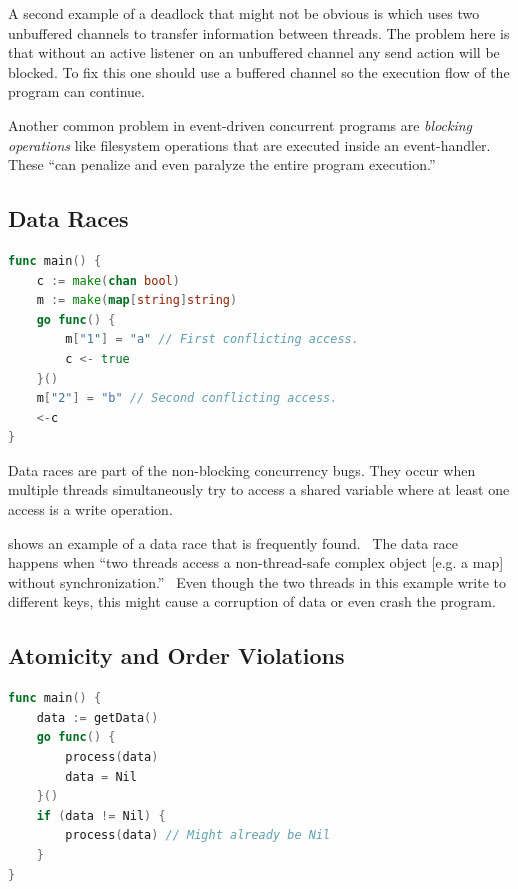\documentclass[conference]{IEEEtran}
\begin{document}
A second example of a deadlock that might not be obvious is  which uses two unbuffered channels to transfer information between threads.
The problem here is that without an active listener on an unbuffered channel any send action will be blocked.
To fix this one should use a buffered channel so the execution flow of the program can continue.

Another common problem in event-driven concurrent programs are \emph{blocking operations} like filesystem operations that are executed inside an event-handler.
These ``can penalize and even paralyze the entire program execution.''~\cite{tchamgoue2012testing}

\subsection{Data Races}
\begin{lstlisting}[float=h, language=Go, label=lst:race, caption=Data race -- based on \cite{goRaceDetector}]
func main() {
	c := make(chan bool)
	m := make(map[string]string)
	go func() {
		m["1"] = "a" // First conflicting access.
		c <- true
	}()
	m["2"] = "b" // Second conflicting access.
	<-c
}
\end{lstlisting}

Data races are part of the non-blocking concurrency bugs.
They occur when multiple threads simultaneously try to access a shared variable where at least one access is a write operation.~\cite{serebry2009threadsanitizer}

 shows an example of a data race that is frequently found.~\cite{serebry2009threadsanitizer}
The data race happens when ``two threads access a non-thread-safe complex object [e.g. a map] without synchronization.''~\cite{serebry2009threadsanitizer}
Even though the two threads in this example write to different keys, this might cause a corruption of data or even crash the program.

\subsection{Atomicity and Order Violations}
\begin{lstlisting}[float=h, language=Go, label=lst:order, caption=Test-and-Use bug pattern -- Order violation]
func main() {
    data := getData()
    go func() {
        process(data)
        data = Nil
    }()
    if (data != Nil) {
        process(data) // Might already be Nil
    }
}
\end{lstlisting}
\end{document}
